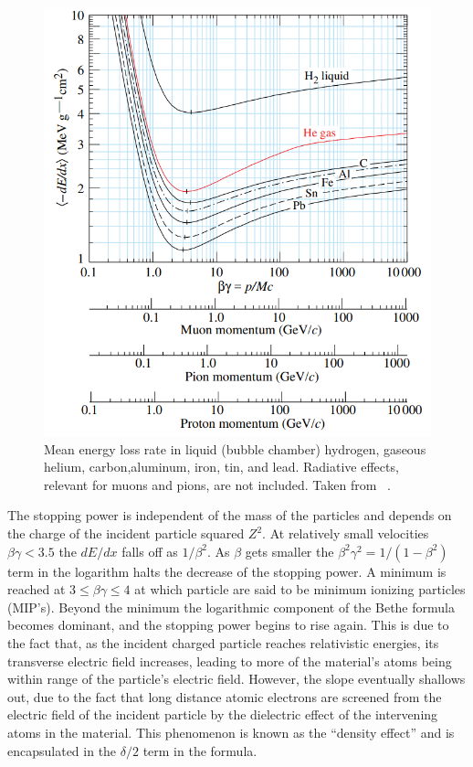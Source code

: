 \begin{figure}
    \centering
    \includegraphics[width=0.7\linewidth]{figures//ch2-Theory/BetheBloch.png}
    \caption[Mean energy loss rate in liquid (bubble chamber) hydrogen, gaseous helium, carbon,aluminum, iron, tin, and lead.]{Mean energy loss rate in liquid (bubble chamber) hydrogen, gaseous helium, carbon,aluminum, iron, tin, and lead. Radiative effects, relevant for muons and pions, are not included. Taken from ~\cite{PDG}. }
    \label{fig:Bethe}
\end{figure}

The stopping power is independent of the mass of the particles and depends on the charge of the incident particle squared $Z^2$. At relatively small velocities $\beta\gamma<3.5$ the $dE/dx$ falls off as $1/\beta^2$. As $\beta$ gets smaller the $\beta^2\gamma^2 = 1/(1-\beta^2)$ term in the logarithm halts the decrease of the stopping power. A minimum is reached at $3 \leq \beta\gamma \leq 4$ at which particle are said to be minimum ionizing particles (MIP's). Beyond the minimum the logarithmic component of the Bethe formula becomes dominant, and the stopping power begins to rise again. This is due to the fact that, as the incident charged particle reaches relativistic energies, its transverse electric field increases, leading to more of the material’s atoms being within range of the particle’s electric field. However, the slope eventually shallows out, due to the fact that  long distance atomic electrons are screened from the electric field of the incident particle by the dielectric effect of the intervening atoms in the material. This phenomenon is known as the \enquote{density effect} and is encapsulated in the $\delta/2$ term in the formula.

